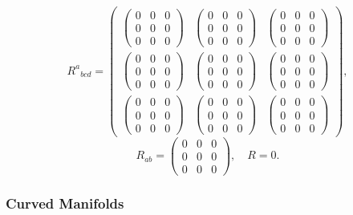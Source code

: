\documentclass[11pt]{article}
\begin{document}
$${R^{a}}_{bcd}=\begin{pmatrix} \begin{pmatrix} 0 & 0 & 0\\ 0 & 0 & 0\\ 0 & 0 & 0 \end{pmatrix} & \begin{pmatrix} 0 & 0 & 0\\ 0 & 0 & 0\\ 0 & 0 & 0 \end{pmatrix} & \begin{pmatrix} 0 & 0 & 0\\ 0 & 0 & 0\\ 0 & 0 & 0 \end{pmatrix}\\ \begin{pmatrix} 0 & 0 & 0\\ 0 & 0 & 0\\ 0 & 0 & 0 \end{pmatrix} & \begin{pmatrix} 0 & 0 & 0\\ 0 & 0 & 0\\ 0 & 0 & 0 \end{pmatrix} & \begin{pmatrix} 0 & 0 & 0\\ 0 & 0 & 0\\ 0 & 0 & 0 \end{pmatrix}\\ \begin{pmatrix} 0 & 0 & 0\\ 0 & 0 & 0\\ 0 & 0 & 0 \end{pmatrix} & \begin{pmatrix} 0 & 0 & 0\\ 0 & 0 & 0\\ 0 & 0 & 0 \end{pmatrix} & \begin{pmatrix} 0 & 0 & 0\\ 0 & 0 & 0\\ 0 & 0 & 0 \end{pmatrix} \end{pmatrix},$$
$$R_{ab}=\begin{pmatrix} 0 & 0 & 0\\ 0 & 0 & 0\\ 0 & 0 & 0 \end{pmatrix},\quad R=0.$$  

    \hypertarget{curved-manifolds}{%
\subsubsection{Curved Manifolds}\label{curved-manifolds}}
\end{document}
